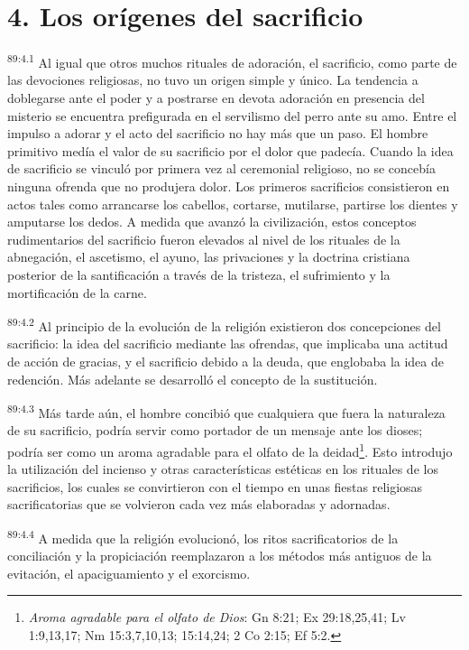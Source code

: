 \documentclass[twoside, 11pt]{book}
\begin{document}
\section*{4. Los orígenes del sacrificio}
\par
\textsuperscript{89:4.1} Al igual que otros muchos rituales de adoración, el sacrificio, como parte de las devociones religiosas, no tuvo un origen simple y único. La tendencia a doblegarse ante el poder y a postrarse en devota adoración en presencia del misterio se encuentra prefigurada en el servilismo del perro ante su amo. Entre el impulso a adorar y el acto del sacrificio no hay más que un paso. El hombre primitivo medía el valor de su sacrificio por el dolor que padecía. Cuando la idea de sacrificio se vinculó por primera vez al ceremonial religioso, no se concebía ninguna ofrenda que no produjera dolor. Los primeros sacrificios consistieron en actos tales como arrancarse los cabellos, cortarse, mutilarse, partirse los dientes y amputarse los dedos. A medida que avanzó la civilización, estos conceptos rudimentarios del sacrificio fueron elevados al nivel de los rituales de la abnegación, el ascetismo, el ayuno, las privaciones y la doctrina cristiana posterior de la santificación a través de la tristeza, el sufrimiento y la mortificación de la carne.

\par
\textsuperscript{89:4.2} Al principio de la evolución de la religión existieron dos concepciones del sacrificio: la idea del sacrificio mediante las ofrendas, que implicaba una actitud de acción de gracias, y el sacrificio debido a la deuda, que englobaba la idea de redención. Más adelante se desarrolló el concepto de la sustitución.

\par
\textsuperscript{89:4.3} Más tarde aún, el hombre concibió que cualquiera que fuera la naturaleza de su sacrificio, podría servir como portador de un mensaje ante los dioses; podría ser como un aroma agradable para el olfato de la deidad\footnote{\textit{Aroma agradable para el olfato de Dios}: Gn 8:21; Ex 29:18,25,41; Lv 1:9,13,17; Nm 15:3,7,10,13; 15:14,24; 2 Co 2:15; Ef 5:2.}. Esto introdujo la utilización del incienso y otras características estéticas en los rituales de los sacrificios, los cuales se convirtieron con el tiempo en unas fiestas religiosas sacrificatorias que se volvieron cada vez más elaboradas y adornadas.

\par
\textsuperscript{89:4.4} A medida que la religión evolucionó, los ritos sacrificatorios de la conciliación y la propiciación reemplazaron a los métodos más antiguos de la evitación, el apaciguamiento y el exorcismo.
\end{document}
